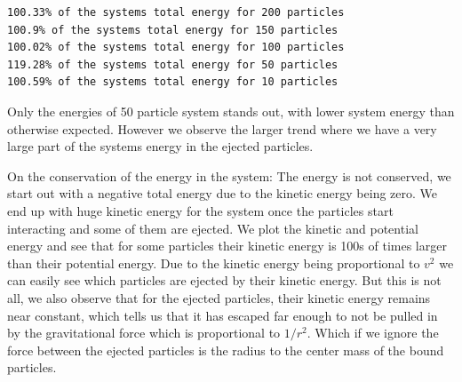 \documentclass{article}
\begin{document}
\begin{verbatim}
100.33% of the systems total energy for 200 particles
100.9% of the systems total energy for 150 particles
100.02% of the systems total energy for 100 particles
119.28% of the systems total energy for 50 particles
100.59% of the systems total energy for 10 particles
\end{verbatim}

Only the energies of 50 particle system stands out, with lower system energy than otherwise expected.
However we observe the larger trend where we have a very large part of the systems energy in the 
ejected particles.

On the conservation of the energy in the system:
The energy is not conserved, we start out with a negative total energy 
due to the kinetic energy being zero. We end up with huge kinetic energy
for the system once the particles start interacting and some of them are
ejected. We plot the kinetic and potential energy and see that for
some particles their kinetic energy is 100s of times larger than their
potential energy. Due to the kinetic energy being proportional to
$v^2$ we can easily see which particles are ejected by their kinetic energy.
But this is not all, we also observe that for the ejected particles, their
kinetic energy remains near constant, which tells us that it has escaped
far enough to not be pulled in by the gravitational force which is proportional
to $1/r^2$. Which if we ignore the force between the ejected particles 
is the radius to the center mass of the bound particles.
\end{document}
